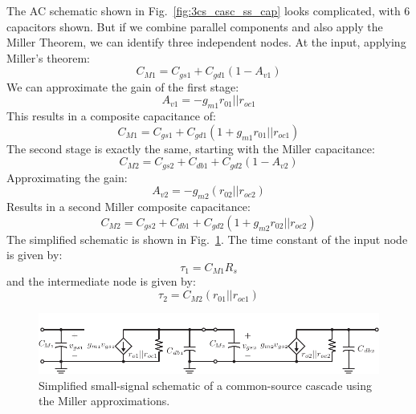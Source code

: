 The AC schematic shown in Fig.~\ref{fig:3cs_casc_ss_cap} looks complicated, with 6 capacitors shown.  But if we combine parallel components and also apply the Miller Theorem, we can identify three independent nodes.  At the input, applying Miller's theorem:
\begin{equation} 
	C_{M1} = C_{gs1} + C_{gd1} (1 - A_{v1}) 
\end{equation}
We can approximate the gain of the first stage:
\begin{equation} 
	A_{v1} = -g_{m1} r_{01}||r_{oc1} 
\end{equation}
This results in a composite capacitance of:
\begin{equation} 
	C_{M1} = C_{gs1} + C_{gd1} (1 + g_{m1} r_{01}||r_{oc1}) 
\end{equation}
The second stage is exactly the same, starting with the Miller capacitance:
\begin{equation} 
	C_{M2} = C_{gs2} + C_{db1} + C_{gd2} (1 - A_{v2}) 
\end{equation}
Approximating the gain:
\begin{equation} 
	A_{v2} = -g_{m2} (r_{02}||r_{oc2})
\end{equation}
Results in a second Miller composite capacitance:
\begin{equation} 
	C_{M2} = C_{gs2} + C_{db1} + C_{gd2} (1 + g_{m2} r_{02}||r_{oc2}) 
\end{equation}
The simplified schematic is shown in Fig.~\ref{fig:4cs_casc_ss_cap_miller}.  The time constant of the input node is given by:
\begin{equation}
 \tau_1 = C_{M1} R_s 
\end{equation}
and the intermediate node is given by:
\begin{equation} 
 \tau_2 = C_{M2} (r_{01} || r_{oc1}) 
\end{equation}
\begin{figure}[tb]
\begin{center}
\includegraphics[scale=1]{4cs_casc_ss_cap_miller}
\end{center}
\caption{Simplified small-signal schematic of a common-source cascade using the Miller approximations.} \label{fig:4cs_casc_ss_cap_miller}
\end{figure}


